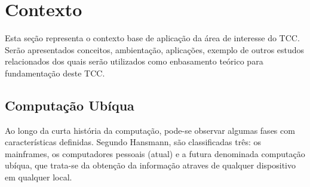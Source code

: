 \section{Contexto}

Esta seção representa o contexto base de aplicação da área de interesse do TCC.
Serão apresentados conceitos, ambientação, aplicações, exemplo de outros estudos
relacionados dos quais serão utilizados como enbasamento teórico para fundamentação
deste TCC.

\subsection{Computação Ubíqua}

Ao longo da curta história da computação, pode-se observar algumas fases com
características definidas. Segundo Hansmann, são classificadas três: os mainframes,
os computadores pessoais (atual) e a futura denominada computação ubíqua, que
trata-se da obtenção da informação atraves de qualquer dispositivo em qualquer
local.
